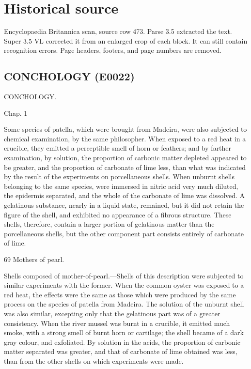\documentclass{article}
\begin{document}
\section*{Historical source}
Encyclopaedia Britannica scan, source row 473. Parse 3.5 extracted the text. Super 3.5 VL corrected it from an enlarged crop of each block. It can still contain recognition errors.
Page headers, footers, and page numbers are removed.

\subsection*{CONCHOLOGY (E0022)}
CONCHOLOGY.

Chap. 1

Some species of patella, which were brought from Madeira, were also subjected to chemical examination, by the same philosopher. When exposed to a red heat in a crucible, they emitted a perceptible smell of horn or feathers; and by farther examination, by solution, the proportion of carbonic matter depleted appeared to be greater, and the proportion of carbonate of lime less, than what was indicated by the result of the experiments on porcellaneous shells. When unburnt shells belonging to the same species, were immersed in nitric acid very much diluted, the epidermis separated, and the whole of the carbonate of lime was dissolved. A gelatinous substance, nearly in a liquid state, remained, but it did not retain the figure of the shell, and exhibited no appearance of a fibrous structure. These shells, therefore, contain a larger portion of gelatinous matter than the porcellaneous shells, but the other component part consists entirely of carbonate of lime.

69
Mothers of pearl.

Shells composed of mother-of-pearl.—Shells of this description were subjected to similar experiments with the former. When the common oyster was exposed to a red heat, the effects were the same as those which were produced by the same process on the species of patella from Madeira. The solution of the unburnt shell was also similar, excepting only that the gelatinous part was of a greater consistency. When the river mussel was burnt in a crucible, it emitted much smoke, with a strong smell of burnt horn or cartilage; the shell became of a dark gray colour, and exfoliated. By solution in the acids, the proportion of carbonic matter separated was greater, and that of carbonate of lime obtained was less, than from the other shells on which experiments were made.
\end{document}
